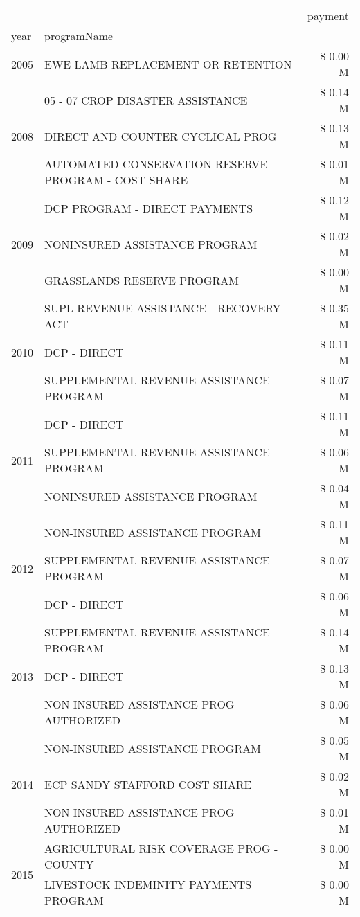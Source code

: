 \begin{tabular}{llr}
\toprule
 &  & payment \\
year & programName &  \\
\midrule
2005 & EWE LAMB REPLACEMENT OR RETENTION & \$ 0.00 M \\
\cline{1-3}
\multirow[t]{3}{*}{2008} & 05 - 07 CROP DISASTER ASSISTANCE & \$ 0.14 M \\
 & DIRECT AND COUNTER CYCLICAL PROG & \$ 0.13 M \\
 & AUTOMATED CONSERVATION RESERVE PROGRAM - COST SHARE & \$ 0.01 M \\
\cline{1-3}
\multirow[t]{3}{*}{2009} & DCP PROGRAM - DIRECT PAYMENTS & \$ 0.12 M \\
 & NONINSURED ASSISTANCE PROGRAM & \$ 0.02 M \\
 & GRASSLANDS RESERVE PROGRAM & \$ 0.00 M \\
\cline{1-3}
\multirow[t]{3}{*}{2010} & SUPL REVENUE ASSISTANCE - RECOVERY ACT & \$ 0.35 M \\
 & DCP - DIRECT & \$ 0.11 M \\
 & SUPPLEMENTAL REVENUE ASSISTANCE PROGRAM & \$ 0.07 M \\
\cline{1-3}
\multirow[t]{3}{*}{2011} & DCP - DIRECT & \$ 0.11 M \\
 & SUPPLEMENTAL REVENUE ASSISTANCE PROGRAM & \$ 0.06 M \\
 & NONINSURED ASSISTANCE PROGRAM & \$ 0.04 M \\
\cline{1-3}
\multirow[t]{3}{*}{2012} & NON-INSURED ASSISTANCE PROGRAM & \$ 0.11 M \\
 & SUPPLEMENTAL REVENUE ASSISTANCE PROGRAM & \$ 0.07 M \\
 & DCP - DIRECT & \$ 0.06 M \\
\cline{1-3}
\multirow[t]{3}{*}{2013} & SUPPLEMENTAL REVENUE ASSISTANCE PROGRAM & \$ 0.14 M \\
 & DCP - DIRECT & \$ 0.13 M \\
 & NON-INSURED ASSISTANCE PROG AUTHORIZED & \$ 0.06 M \\
\cline{1-3}
\multirow[t]{3}{*}{2014} & NON-INSURED ASSISTANCE PROGRAM & \$ 0.05 M \\
 & ECP SANDY STAFFORD COST SHARE & \$ 0.02 M \\
 & NON-INSURED ASSISTANCE PROG AUTHORIZED & \$ 0.01 M \\
\cline{1-3}
\multirow[t]{3}{*}{2015} & AGRICULTURAL RISK COVERAGE PROG - COUNTY & \$ 0.00 M \\
 & LIVESTOCK INDEMINITY PAYMENTS PROGRAM & \$ 0.00 M \\

\end{tabular}
